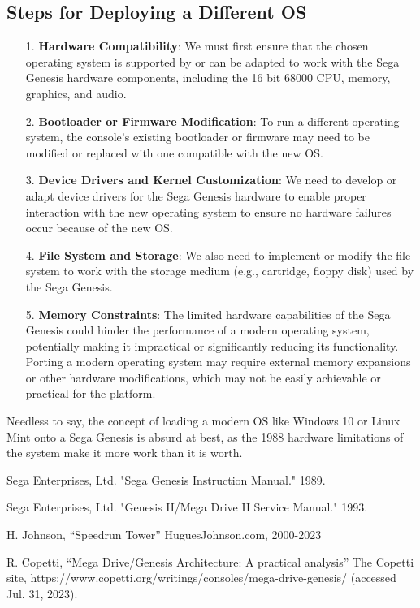 \documentclass[12pt]{article}
\begin{document}
\subsection*{Steps for Deploying a Different OS}
\begin{itemize}
\item[1.]\textbf{Hardware Compatibility}: We must first ensure that the chosen operating system is supported by or can be adapted to work with the Sega Genesis hardware components, including the 16 bit 68000 CPU, memory, graphics, and audio.

\item[2.]\textbf{Bootloader or Firmware Modification}: To run a different operating system, the console's existing bootloader or firmware may need to be modified or replaced with one compatible with the new OS.

\item[3.]\textbf{Device Drivers and Kernel Customization}: We need to develop or adapt device drivers for the Sega Genesis hardware to enable proper interaction with the new operating system to ensure no hardware failures occur because of the new OS.

\item[4.]\textbf{File System and Storage}: We also need to implement or modify the file system to work with the storage medium (e.g., cartridge, floppy disk) used by the Sega Genesis.

\item[5.]\textbf{Memory Constraints}: The limited hardware capabilities of the Sega Genesis could hinder the performance of a modern operating system, potentially making it impractical or significantly reducing its functionality.
Porting a modern operating system may require external memory expansions or other hardware modifications, which may not be easily achievable or practical for the platform.
\end{itemize}

Needless to say, the concept of loading a modern OS like Windows 10 or Linux Mint onto a Sega Genesis is absurd at best, as the 1988 hardware limitations of the system make it more work than it is worth.

\newpage
\begin{thebibliography}{9}

Sega Enterprises, Ltd. "Sega Genesis Instruction Manual." 1989.

Sega Enterprises, Ltd. "Genesis II/Mega Drive II Service Manual." 1993.

H. Johnson, “Speedrun Tower” HuguesJohnson.com, 2000-2023

R. Copetti, “Mega Drive/Genesis Architecture: A practical analysis” The Copetti site, https://www.copetti.org/writings/consoles/mega-drive-genesis/ (accessed Jul. 31, 2023). 

\end{thebibliography}
\end{document}
